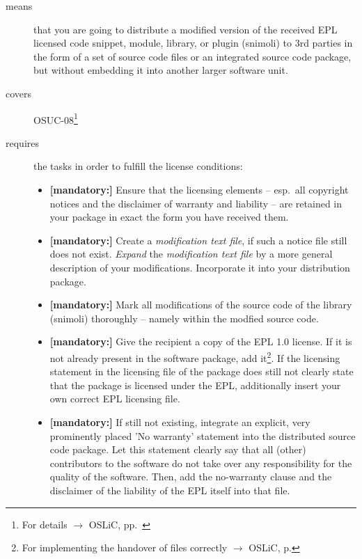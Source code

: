 \begin{description}
\item[means] that you are going to distribute a modified version of the received
EPL licensed code snippet, module, library, or plugin (snimoli) to 3rd
parties in the form of a set of source code files or an integrated source code
package, but without embedding it into another larger software unit.
\item[covers] OSUC-08\footnote{For details $\rightarrow$ OSLiC, pp.\ \pageref{OSUC-08-DEF}}
\item[requires] the tasks in order to fulfill the license conditions:
\begin{itemize}

  \item \textbf{[mandatory:]} Ensure that the licensing elements -- esp.\ all
  copyright notices and the disclaimer of warranty and liability -- are retained
  in your package in exact the form you have received them.

  \item \textbf{[mandatory:]} Create a \emph{modification text file}, if such a
  notice file still does not exist. \emph{Expand} the \emph{modification text
  file} by a more general description of your modifications. Incorporate it into
  your distribution package.

  \item \textbf{[mandatory:]} Mark all modifications of the source code of the
  library (snimoli) thoroughly -- namely within
  the modfied source code.
  
  \item \textbf{[mandatory:]} Give the recipient a copy of the EPL 1.0 license.
  If it is not already present in the software package, add it\footnote{For
  implementing the handover of files correctly $\rightarrow$ OSLiC, p.
  \pageref{DistributingFilesHint}}. If the licensing statement in the licensing
  file of the package does still not clearly state that the package is licensed
  under the EPL, additionally insert your own correct EPL licensing file.
  
  \item \textbf{[mandatory:]} If still not existing, integrate an explicit, very
  prominently placed 'No warranty' statement into the distributed source code
  package. Let this statement clearly say that all (other) contributors to the
  software do not take over any responsibility for the quality of the software.
  Then, add the no-warranty clause and the disclaimer of the liability of the
  EPL itself into that file.
  

\end{itemize}
\end{description}
